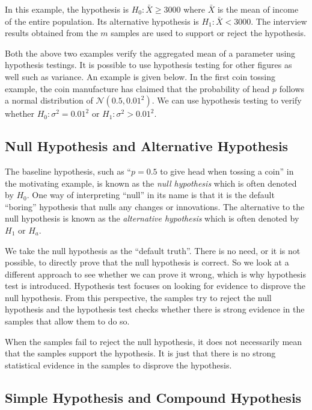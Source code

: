 In this example, the hypothesis is $H_0: \bar{X} \geq 3000$ where $\bar{X}$ is the mean of income of the entire population. Its alternative hypothesis is $H_1: \bar{X}<3000$. The interview results obtained from the $m$ samples are used to support or reject the hypothesis.

Both the above two examples verify the aggregated mean of a parameter using hypothesis testings. It is possible to use hypothesis testing for other figures as well such as variance. An example is given below. In the first coin tossing example, the coin manufacture has claimed that the probability of head $p$ follows a normal distribution of $\mathcal{N}(0.5,0.01^2)$. We can use hypothesis testing to verify whether $H_0:\sigma^2=0.01^2$ or $H_1:\sigma^2>0.01^2$.

\subsection{Null Hypothesis and Alternative Hypothesis}

The baseline hypothesis, such as ``$p=0.5$ to give head when tossing a coin'' in the motivating example, is known as the \textit{null hypothesis} which is often denoted by $H_0$. One way of interpreting ``null'' in its name is that it is the default ``boring'' hypothesis that nulls any changes or innovations. The alternative to the null hypothesis is known as the \textit{alternative hypothesis} which is often denoted by $H_1$ or $H_a$.

We take the null hypothesis as the ``default truth''. There is no need, or it is not possible, to directly prove that the null hypothesis is correct. So we look at a different approach to see whether we can prove it wrong, which is why hypothesis test is introduced. Hypothesis test focuses on looking for evidence to disprove the null hypothesis. From this perspective, the samples try to reject the null hypothesis and the hypothesis test checks whether there is strong evidence in the samples that allow them to do so.

When the samples fail to reject the null hypothesis, it does not necessarily mean that the samples support the hypothesis. It is just that there is no strong statistical evidence in the samples to disprove the hypothesis.


\subsection{Simple Hypothesis and Compound Hypothesis}

